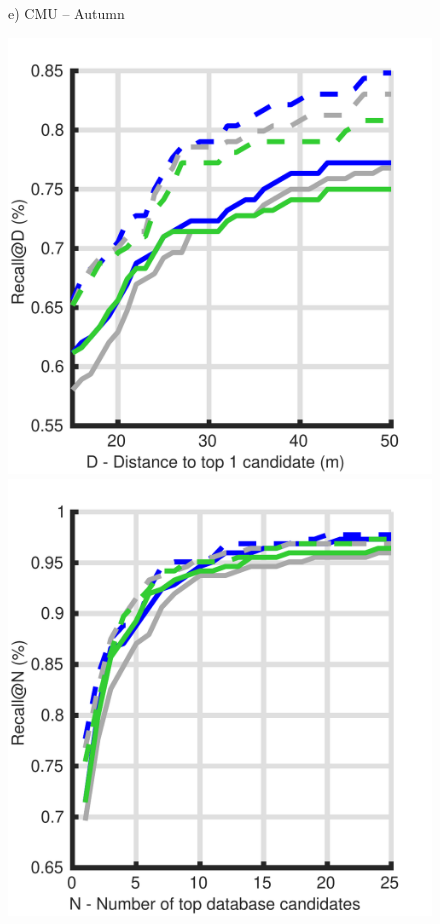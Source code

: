 \begin{figure}
\begin{minipage}{0.27\linewidth}
		e) CMU -- Autumn
	\end{minipage}

	\vspace{5pt}	
	
	\begin{minipage}{0.27\linewidth}
		\center \scriptsize
		\includegraphics[width=\linewidth]{plot/depth_vs_ref/Results_lt_queries/distance}	
		
		\includegraphics[width=\linewidth]{plot/depth_vs_ref/Results_lt_queries/recall}
		

\end{minipage}
\end{figure}
